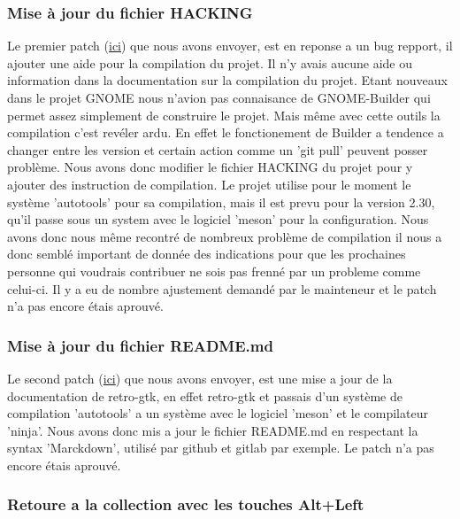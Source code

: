 \documentclass[12pt]{report}
\begin{document}
\subsubsection{Mise à jour du fichier HACKING}
Le premier patch (\href{http://bugzilla.gnome.org/show_bug.cgi?id=788692}{ici}) 
que nous avons envoyer, est en reponse a un bug repport, il ajouter une 
aide pour la compilation du projet. \newline
Il n'y avais aucune aide ou information dans la documentation sur la compilation
du projet. Etant nouveaux dans le projet GNOME nous n'avion pas connaisance de 
GNOME-Builder qui permet assez simplement de construire le projet. Mais
même avec cette outils la compilation c'est revéler ardu. En effet 
le fonctionement de Builder a tendence a changer entre les version et certain
action comme un 'git pull' peuvent posser problème.
Nous avons donc modifier le fichier HACKING du projet pour y ajouter des 
instruction de compilation. Le projet utilise pour le moment le système 
'autotools' pour sa compilation, mais il est prevu pour la version 2.30, 
qu'il passe sous un system avec le logiciel 'meson' pour la configuration. 
\newline
Nous avons donc nous même recontré de nombreux problème de compilation 
il nous a donc semblé important de donnée des indications pour que les 
prochaines personne qui voudrais contribuer ne sois pas frenné par un 
probleme comme celui-ci.
Il y a eu de nombre ajustement demandé par le mainteneur et le patch n'a 
pas encore étais aprouvé. \newline

\subsubsection{Mise à jour du fichier README.md}
Le second patch (\href{http://bugzilla.gnome.org/show_bug.cgi?id=790454}{ici}) 
que nous avons envoyer, est une mise a jour de la documentation de retro-gtk, 
en effet retro-gtk et passais d'un système de compilation 'autotools' a un
système avec le logiciel 'meson' et le compilateur 'ninja'.
Nous avons donc mis a jour le fichier README.md en respectant la syntax
'Marckdown', utilisé par github et gitlab par exemple.
Le patch n'a pas encore étais aprouvé. \newline

\subsubsection{Retoure a la collection avec les touches Alt+Left}
\end{document}
